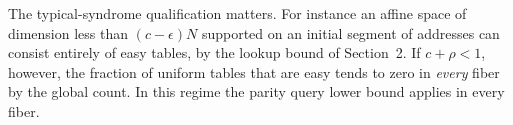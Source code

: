 The typical-syndrome qualification matters. For instance an affine space of dimension less than $(c-\epsilon)N$ supported on an initial segment of addresses can consist entirely of easy tables, by the lookup bound of Section~2. If $c+\rho<1$, however, the fraction of uniform tables that are easy tends to zero in \emph{every} fiber by the global count. In this regime the parity query lower bound applies in every fiber.
